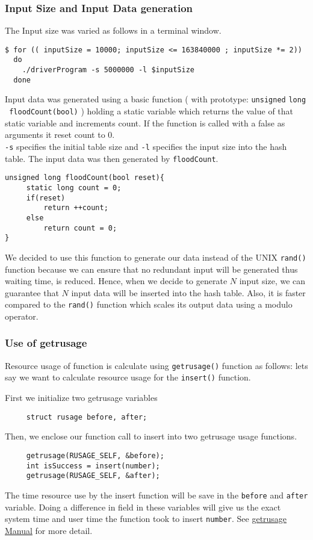 \documentclass[a4paper,12pt, openany]{book}
\begin{document}
\subsubsection{Input Size and  Input Data generation}
The Input size was varied as follows in a terminal window.
\begin{verbatim}
$ for (( inputSize = 10000; inputSize <= 163840000 ; inputSize *= 2))
  do
    ./driverProgram -s 5000000 -l $inputSize
  done
\end{verbatim} 
 
Input data was generated using a basic function ( with prototype: \texttt{unsigned} \texttt{long}\\ \texttt{ floodCount(bool)} ) holding a static variable which returns the value of that static variable and increments count. If the function is called with a false as arguments it reset count to 0.\\

\texttt{-s} specifies the initial table size and \texttt{-l} specifies the input size into the hash table. The input data was then generated by \texttt{floodCount}.


\begin{verbatim}
unsigned long floodCount(bool reset){
     static long count = 0;
     if(reset)
         return ++count;
     else
         return count = 0;
}
\end{verbatim}

We decided to use this function to generate our data instead of the UNIX \texttt{rand()} function because we can ensure that no redundant input will be generated thus waiting time, is reduced. Hence, when we decide to generate $N$ input size, we can guarantee that $N$ input data will be inserted into the hash table. Also, it is faster compared to the \texttt{rand()} function which scales its output data using a modulo operator. 

\subsubsection{Use of getrusage}

Resource usage of function is calculate using \texttt{getrusage()} function as follows: lets say we want to calculate resource usage for the \texttt{insert()} function. 

First we initialize two getrusage variables 
\begin{verbatim}
     struct rusage before, after;
\end{verbatim}
Then, we enclose our function call to insert into two getrusage usage functions.
\begin{verbatim}
     getrusage(RUSAGE_SELF, &before);
     int isSuccess = insert(number);
     getrusage(RUSAGE_SELF, &after);
\end{verbatim}
The time resource use by the insert function will be save in the \texttt{before} and \texttt{after} variable. Doing a difference in field in these variables will give us the exact system time and user time the function took to insert \texttt{number}. See \href{http://man7.org/linux/man-pages/man2/getrusage.2.html}{getrusage Manual} for more detail. 
\end{document}
